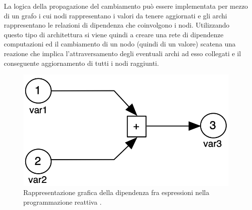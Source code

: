 \documentclass[12pt,a4paper,openright,twoside]{book}
\begin{document}
La logica della propagazione del cambiamento può essere implementata per mezzo di un grafo i cui nodi rappresentano i valori da tenere aggiornati e gli archi rappresentano le relazioni di dipendenza che coinvolgono i nodi. Utilizzando questo tipo di architettura si viene quindi a creare una rete di dipendenze computazioni ed il cambiamento di un nodo (quindi di un valore) scatena una reazione che implica l'attraversamento degli eventuali archi ad esso collegati e il conseguente aggiornamento di tutti i nodi raggiunti. 

\begin{figure}
    \centering
    \includegraphics[width=.65\linewidth]{figures/reactive-programming/RP-dependency.png}
    \caption{Rappresentazione grafica della dipendenza fra espressioni nella programmazione reattiva \cite{DBLP:journals/csur/BainomugishaCCMM13}.}
    \label{fig:rp-dependency}
\end{figure}
\end{document}
